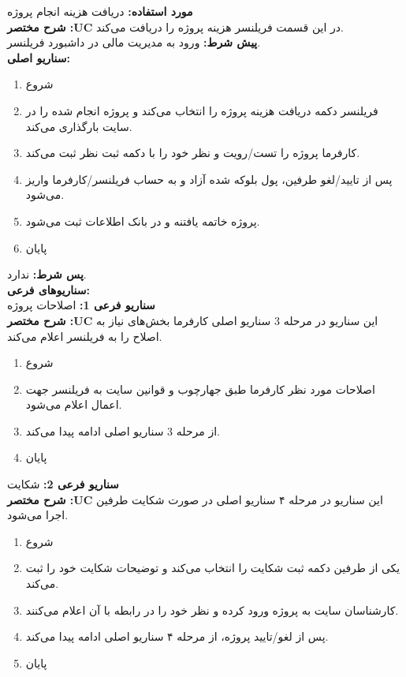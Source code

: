 \textbf{مورد استفاده:}
دریافت هزینه انجام پروژه
\\
\textbf{شرح مختصر :UC}
در این قسمت فریلنسر هزینه پروژه را دریافت می‌کند.
\\
\textbf{پيش شرط:}
ورود به مدیریت مالی در داشبورد فریلنسر.
\\
\textbf{سناريو اصلی:}
\begin{enumerate}
\item
شروع
\item
فریلنسر دکمه دریافت هزینه پروژه را انتخاب می‌کند و پروژه  انجام شده را در سایت بارگذاری می‌کند.
\item
کارفرما پروژه را تست/رویت و نظر خود را با دکمه ثبت نظر ثبت می‌کند.
\item
پس از تایید/لغو طرفین، پول بلوکه شده آزاد و به حساب فریلنسر/کارفرما واریز می‌شود.
\item
پروژه خاتمه یافتنه و در بانک اطلاعات ثبت می‌شود.
\item
پایان
\end{enumerate}

\noindent
\textbf{پس شرط:}
ندارد.
\\
\textbf{سناريوهای فرعی:}
\\
\textbf{سناريو فرعی 1:}
اصلاحات پروژه
\\
\textbf{شرح مختصر :UC}
این سناریو در مرحله 3 سناریو اصلی کارفرما بخش‌های نیاز به اصلاح را به فریلنسر اعلام می‌کند.
\begin{enumerate}
\item
شروع
\item
اصلاحات مورد نظر کارفرما طبق جهارچوب و قوانین سایت به فریلنسر جهت اعمال اعلام می‌شود.
\item
از مرحله 3 سناریو اصلی ادامه پیدا می‌کند.
\item
پایان
\end{enumerate}

\noindent
\textbf{سناريو فرعی 2:}
شکایت
\\
\textbf{شرح مختصر :UC}
این سناریو در مرحله ۴ سناریو اصلی در صورت شکایت طرفین اجرا می‌شود.
\begin{enumerate}
\item
شروع
\item
یکی از طرفین دکمه ثبت شکایت را انتخاب می‌کند و توضیحات شکایت خود را ثبت می‌کند.
\item
کارشناسان سایت به پروژه ورود کرده و نظر خود را در رابطه با آن اعلام می‌کنند.
\item
پس از لغو/تایید پروژه، از مرحله ۴ سناریو اصلی ادامه پیدا می‌کند.
\item
پایان
\end{enumerate}

